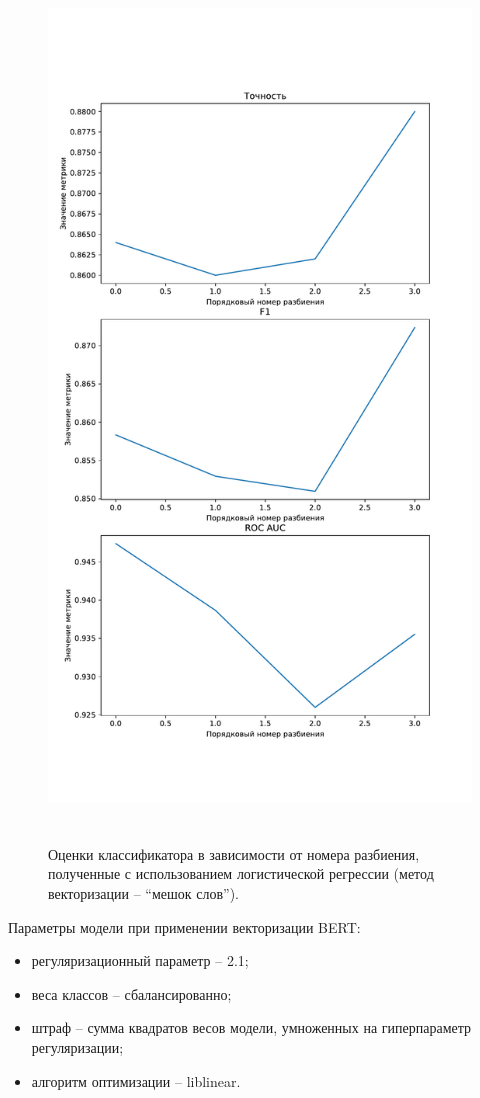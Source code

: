 \begin{figure}[H]
	\centering
	\includegraphics[height=23cm]{inc/plots/logicMetricsBag.pdf}
	\caption{ Оценки классификатора в зависимости от номера разбиения, полученные с использованием логистической регрессии (метод векторизации --  ``мешок слов''). }
	\label{img:logicMetricsBag}
\end{figure}


Параметры модели при применении векторизации BERT:
\begin{itemize}
	\item регуляризационный параметр -- 2.1;
	\item веса классов -- сбалансированно;
	\item штраф -- сумма квадратов весов модели, умноженных на гиперпараметр регуляризации;
	\item алгоритм оптимизации -- liblinear.
\end{itemize}

